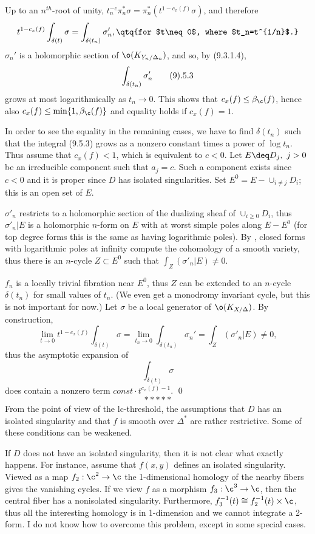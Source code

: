 Up to an $n^{th}$-root of unity, $t_n^{-c}\pi_n^*\sigma=
\pi_n^*(t^{1-c_x(f)}\sigma)$, and therefore
$$
t^{1-c_x(f)}\int_{\delta(t)}\sigma=\int_{\delta(t_n)}\sigma_n',
\qtq{for $t\neq 0$, where $t_n=t^{1/n}$.}
$$
  $\sigma_n'$ is a holomorphic
section of $\o(K_{Y_n/\Delta_n})$, and so, by (9.3.1.4), 
$$
\int_{\delta(t_n)}\sigma_n'\tag 9.5.3
$$
grows at most logarithmically as $t_n\to 0$. This shows that
$c_x(f)\leq \beta_{\c}(f)$, hence also $c_x(f)\leq
\min\{1,\beta_{\c}(f)\}$ and equality holds if $c_x(f)=1$.

In order to see the equality in the remaining cases, 
we have to find $\delta(t_n)$ such that the integral (9.5.3) grows as a
nonzero constant times a power of  $\log t_n$.  Thus assume that 
$c_x(f)<1$, which is equivalent to $c<0$.  Let $E\deq
D_j,\ j>0$ be an irreducible component  such that $a_j=c$. Such a component
exists since $c<0$ and it is proper since $D$ has isolated singularities. 
Set  
$E^0=E-\cup_{i\neq j}D_i$; this is  an open set of $E$.  

$\sigma'_n$ restricts to a holomorphic section of the dualizing
sheaf of $\cup_{i\geq 0}D_i$, thus
 $\sigma'_n|E$ is
a holomorphic $n$-form on
$E$ with at worst simple poles along $E-E^0$ (for top degree forms this
is the same as having logarithmic poles).  By
\cite{Deligne71}, closed forms with logarithmic poles at infinity compute the
cohomology of a smooth  variety,  thus there is an
$n$-cycle
$Z\subset E^0$ such that $\int_Z (\sigma'_n|E)\neq 0$. 

$f_n$ is a locally trivial fibration    near $E^0$, thus $Z$ can be extended
to an $n$-cycle
$\delta(t_n)$ for small values of $t_n$. 
(We even get a monodromy invariant cycle, but this is not important for now.)
Let $\sigma$ be a local generator of
$\o(K_{X/\Delta})$.  By construction,
$$
\lim_{t\to 0}t^{1-c_x(f)}\int_{\delta(t)}\sigma=\lim_{t_n\to
0}\int_{\delta(t_n)}\sigma_n'=\int_Z (\sigma'_n|E)\neq 0,
$$
thus the asymptotic expansion of 
$$
\int_{\delta(t)}\sigma
$$
does contain a nonzero term $const\cdot t^{c_x(f)-1}$. \qed\enddemo
$$
*****
$$
  From the point of view of the lc-threshold, the
assumptions that $D$ has an isolated singularity and that $f$ is smooth over
$\Delta^*$ are rather restrictive. Some of these conditions can be weakened.

If $D$ does not have  an isolated singularity, then it is not clear what
exactly happens. For instance, assume that $f(x,y)$ defines an isolated
singularity. Viewed as a map $f_2: \c^2\to \c$ the  1-dimensional
homology of the nearby fibers gives the vanishing cycles. If we view $f$ as a
morphism $f_3:\c^3\to \c$, then the central fiber has a  nonisolated
singularity.  Furthermore, $f_3^{-1}(t)\cong f_2^{-1}(t)\times \c$, thus all
the interesting homology is in 1-dimension and we cannot integrate a 2-form.
I do not know how to overcome this problem, except in some special cases.


